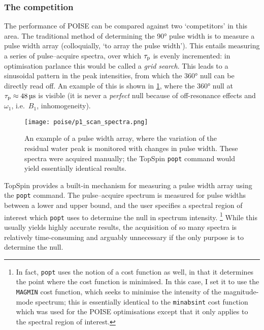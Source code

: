 \subsubsection{The competition}

The performance of POISE can be compared against two `competitors' in this area.
The traditional method of determining the \ang{90} pulse width is to measure a pulse width array (colloquially, `to array the pulse width').\autocite{Keifer1999CMR}
This entails measuring a series of pulse--acquire spectra, over which $\tau_\mathrm{p}$ is evenly incremented: in optimisation parlance this would be called a \textit{grid search}.
This leads to a sinusoidal pattern in the peak intensities, from which the \ang{360} null can be directly read off.
An example of this is shown in \cref{fig:p1_scan_spectra}, where the \ang{360} null at $\taup \approx \SI{48}{\us}$ is visible (it is never a \textit{perfect} null because of off-resonance effects and $\omega_1$, i.e.\ $B_1$, inhomogeneity).

\begin{figure}[htb]
    \centering
    \texttt{[image: poise/p1\_scan\_spectra.png]}%
    \caption[Pulse width array]{
        An example of a pulse width array, where the variation of the residual water peak is monitored with changes in pulse width.
        These spectra were acquired manually; the TopSpin \texttt{popt} command would yield essentially identical results.
    }
    \label{fig:p1_scan_spectra}
\end{figure}

TopSpin provides a built-in mechanism for measuring a pulse width array using the \texttt{popt} command.
The pulse--acquire spectrum is measured for pulse widths between a lower and upper bound, and the user specifies a spectral region of interest which \texttt{popt} uses to determine the null in spectrum intensity.%
\footnote{In fact, \texttt{popt} uses the notion of a cost function as well, in that it determines the point where the cost function is minimised. In this case, I set it to use the \texttt{MAGMIN} cost function, which seeks to minimise the intensity of the magnitude-mode spectrum; this is essentially identical to the \texttt{minabsint} cost function which was used for the POISE optimisations except that it only applies to the spectral region of interest.}
While this usually yields highly accurate results, the acquisition of so many spectra is relatively time-consuming and arguably unnecessary if the only purpose is to determine the null.

